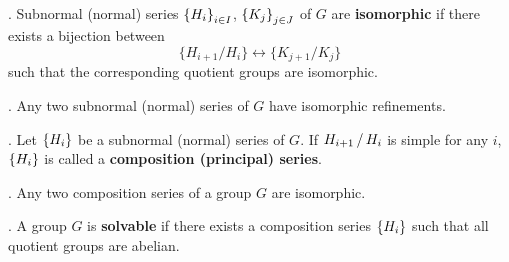 . Subnormal (normal) series \(\left\{ H_i \right\}_{i \in I}\), \(\left\{ K_j \right\}_{j \in J}\) of \(G\) are \textbf{isomorphic} if there exists a bijection between
\[
    \{H_{i+1} / H_i\} \longleftrightarrow \{K_{j+1} / K_j\}
\]
such that the corresponding quotient groups are isomorphic.

\thm.  Any two subnormal (normal) series of \(G\) have isomorphic refinements.

. Let \(\left\{ H_i \right\}\) be a subnormal (normal) series of \(G\). If \(H_{i+1} \operatorname{/} H_i\) is simple for any \(i\), \(\left\{ H_i \right\}\) is called a \textbf{composition (principal) series}.

\thm.  Any two composition series of a group \(G\) are isomorphic.

.  A group \(G\) is \textbf{solvable} if there exists a composition series \(\left\{ H_i \right\}\) such that all quotient groups are abelian.

\pagebreak
